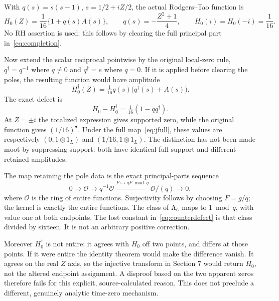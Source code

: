 \documentclass[11pt,a4paper]{article}
\theoremstyle{definition}\newtheorem{definition}[theorem]{Definition}\newtheorem{remark}[theorem]{Remark}
\begin{document}
With $q(s)=s(s-1)$, $s=1/2+iZ/2$, the actual Rodgers--Tao function is
\begin{equation}
 H_0(Z)=\frac1{16}\{1+q(s)A(s)\},\qquad
 q(s)=-\frac{Z^2+1}{4},\qquad
 \boxed{H_0(i)=H_0(-i)=\frac1{16}.}                     \label{eq:counterterm}
\end{equation}
No RH assertion is used: this follows by clearing the full principal part in~\eqref{eq:completion}.

Now extend the scalar reciprocal pointwise by the original local-zero rule, $q^\dagger=q^{-1}$ where $q\ne0$ and $q^\dagger=e$ where $q=0$. If it is applied before clearing the poles, the resulting function would have amplitude
\[
 H_0^\dagger(Z)=\tfrac1{16}q(s)\bigl(q^\dagger(s)+A(s)\bigr).
\]
The exact defect is
\begin{equation}
 \boxed{H_0-H_0^\dagger=\tfrac1{16}(1-qq^\dagger).}     \label{eq:counterdefect}
\end{equation}
At $Z=\pm i$ the totalized expression gives supported zero, while the original function gives $(1/16)^\bullet$. Under the full map~\eqref{eq:jfull}, these values are respectively $(0,1\otimes1_L)$ and $(1/16,1\otimes1_L)$. The distinction has not been made moot by suppressing support: both have identical full support and different retained amplitudes.

The map retaining the pole data is the exact principal-parts sequence
\begin{equation}
 0\longrightarrow\mathcal O\longrightarrow q^{-1}\mathcal O
 \xrightarrow{F\mapsto qF\bmod q}\mathcal O/(q)\longrightarrow0, \label{eq:principalparts}
\end{equation}
where $\mathcal O$ is the ring of entire functions. Surjectivity follows by choosing $F=g/q$; the kernel is exactly the entire functions. The class of $\Lambda_{\rm c}$ maps to $1\bmod q$, with value one at both endpoints. The lost constant in~\eqref{eq:counterdefect} is that class divided by sixteen. It is not an arbitrary positive correction.

Moreover $H_0^\dagger$ is not entire: it agrees with $H_0$ off two points, and differs at those points. If it were entire the identity theorem would make the difference vanish. It agrees on the real $Z$ axis, so the injective transform in Section 7 would return $H_0$, not the altered endpoint assignment. A disproof based on the two apparent zeros therefore fails for this explicit, source-calculated reason. This does not preclude a different, genuinely analytic time-zero mechanism.
\end{document}
